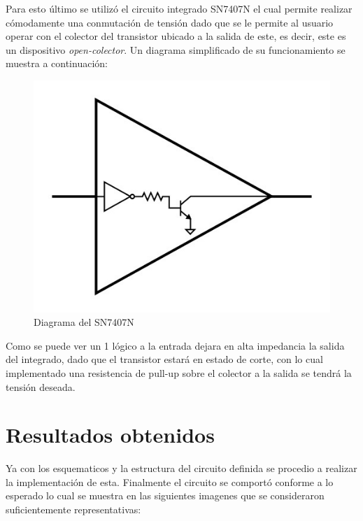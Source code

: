Para esto último se utilizó el circuito integrado SN7407N el cual permite realizar cómodamente una conmutación de tensión dado que se le permite al usuario operar con el colector del transistor ubicado a la salida de este, es decir, este es un dispositivo \emph{open-colector}. Un diagrama simplificado de su funcionamiento se muestra a continuación:\\

\begin{figure}[H]
\begin{centering}
\includegraphics[scale=1.2]{../Ejercicio-3/imagenes/SN7407N.jpg}
\par\end{centering}
\caption{Diagrama del SN7407N}

\end{figure}

Como se puede ver un 1 lógico a la entrada dejara en alta impedancia la salida del integrado, dado que el transistor estará en estado de corte, con lo cual implementado una resistencia de pull-up sobre el colector a la salida se tendrá la tensión deseada.\\

\section{Resultados obtenidos}
Ya con los esquematicos y la estructura del circuito definida se procedio a realizar la implementación de esta. Finalmente el circuito se comportó conforme a lo esperado lo cual se muestra en las siguientes imagenes que se consideraron suficientemente representativas:\\

